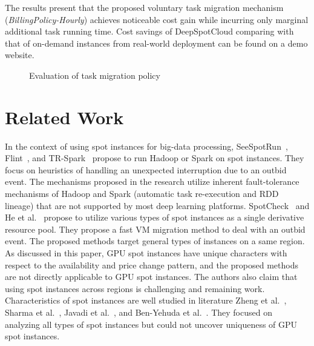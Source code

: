 \documentclass[conference]{IEEEtran}
\begin{document}
The results present that the proposed voluntary task migration mechanism (\textit{BillingPolicy-Hourly}) achieves noticeable cost gain while incurring only marginal additional task running time. Cost savings of DeepSpotCloud comparing with that of on-demand instances from real-world deployment can be found on a demo website.

\begin{figure}
  \centering
  \caption{\label{fig:migraion-evaluation}Evaluation of task migration policy}
\end{figure}

\section{Related Work}
In the context of using spot instances for big-data processing, SeeSpotRun~\cite{see-spot-run}, Flint~\cite{flint}, and TR-Spark~\cite{tr-spark} propose to run Hadoop or Spark on spot instances. They focus on heuristics of handling an unexpected interruption due to an outbid event. The mechanisms proposed in the research utilize inherent fault-tolerance mechanisms of Hadoop and Spark (automatic task re-execution and RDD lineage) that are not supported by most deep learning platforms. SpotCheck~\cite{spotcheck} and He et al.~\cite{spot-server-migrate} propose to utilize various types of spot instances as a single derivative resource pool. They propose a fast VM migration method to deal with an outbid event. The proposed methods target general types of instances on a same region. As discussed in this paper, GPU spot instances have unique characters with respect to the availability and price change pattern, and the proposed methods are not directly applicable to GPU spot instances. The authors also claim that using spot instances across regions is challenging and remaining work. Characteristics of spot instances are well studied in literature Zheng et al.~\cite{how-to-bid-cloud}, Sharma et al.~\cite{not-bid-cloud}, Javadi et al.~\cite{si-price-modeling}, and Ben-Yehuda et al.~\cite{spot-instance-pricing-analysis}. They focused on analyzing all types of spot instances but could not uncover uniqueness of GPU spot instances.
\end{document}
